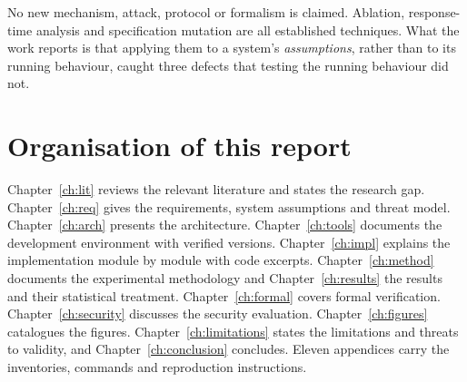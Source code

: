 No new mechanism, attack, protocol or formalism is claimed. Ablation, response-time analysis
and specification mutation are all established techniques. What the work reports is that
applying them to a system's \emph{assumptions}, rather than to its running behaviour, caught
three defects that testing the running behaviour did not.

\section{Organisation of this report}

Chapter~\ref{ch:lit} reviews the relevant literature and states the research gap.
Chapter~\ref{ch:req} gives the requirements, system assumptions and threat model.
Chapter~\ref{ch:arch} presents the architecture. Chapter~\ref{ch:tools} documents the
development environment with verified versions. Chapter~\ref{ch:impl} explains the
implementation module by module with code excerpts. Chapter~\ref{ch:method} documents the
experimental methodology and Chapter~\ref{ch:results} the results and their statistical
treatment. Chapter~\ref{ch:formal} covers formal verification. Chapter~\ref{ch:security}
discusses the security evaluation. Chapter~\ref{ch:figures} catalogues the figures.
Chapter~\ref{ch:limitations} states the limitations and threats to validity, and
Chapter~\ref{ch:conclusion} concludes. Eleven appendices carry the inventories, commands and
reproduction instructions.
